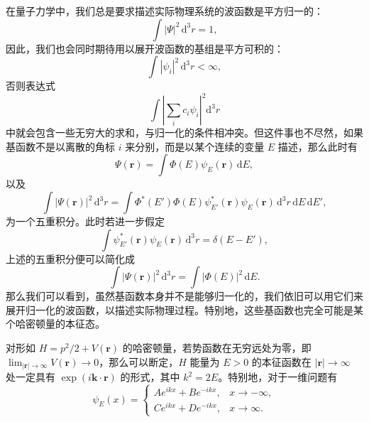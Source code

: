 在量子力学中，我们总是要求描述实际物理系统的波函数是平方归一的：
\begin{equation}
 \int |\Psi|^2\,\mathrm d^3r=1,
\tag{6.1.11}
\end{equation}
因此，我们也会同时期待用以展开波函数的基组是平方可积的：
\begin{equation}
 \int |\psi_i|^2\,\mathrm d^3r<\infty,
\tag{6.1.12}
\end{equation}
否则表达式
\begin{equation}
 \int\left|\sum_i c_i\psi_i\right|^2\mathrm d^3r
\tag{6.1.13}
\end{equation}
中就会包含一些无穷大的求和，与归一化的条件相冲突。但这件事也不尽然，如果基函数不是以离散的角标 $i$ 来分别，而是以某个连续的变量 $E$ 描述，那么此时有
\begin{equation}
 \Psi(\bm r)=\int \Phi(E)\psi_E(\bm r)\,\mathrm dE,
\tag{6.1.14}
\end{equation}
以及
\begin{equation}
 \int|\Psi(\bm r)|^2\,\mathrm d^3r
 =\int \Phi^*(E')\Phi(E)\psi_{E'}^*(\bm r)\psi_E(\bm r)\,\mathrm d^3r\,\mathrm dE\,\mathrm dE',
\tag{6.1.15}
\end{equation}
为一个五重积分。此时若进一步假定
\begin{equation}
 \int \psi_{E'}^*(\bm r)\psi_E(\bm r)\,\mathrm d^3r=\delta(E-E'),
\tag{6.1.16}
\end{equation}
上述的五重积分便可以简化成
\begin{equation}
 \int|\Psi(\bm r)|^2\,\mathrm d^3r=\int|\Phi(E)|^2\,\mathrm dE.
\tag{6.1.17}
\end{equation}
那么我们可以看到，虽然基函数本身并不是能够归一化的，我们依旧可以用它们来展开归一化的波函数，以描述实际物理过程。特别地，这些基函数也完全可能是某个哈密顿量的本征态。

对形如 $H=p^2/2+V(\bm r)$ 的哈密顿量，若势函数在无穷远处为零，即 $\lim_{|\bm r|\to\infty}V(\bm r)\to0$，那么可以断定，$H$ 能量为 $E>0$ 的本征函数在 $|\bm r|\to\infty$ 处一定具有 $\exp(i\bm k\cdot\bm r)$ 的形式，其中 $k^2=2E$。特别地，对于一维问题有
\begin{equation}
 \psi_E(x)=
 \begin{cases}
 Ae^{ikx}+Be^{-ikx},&x\to-\infty,\\
 Ce^{ikx}+De^{-ikx},&x\to\infty.
 \end{cases}
\tag{6.1.18}
\end{equation}

